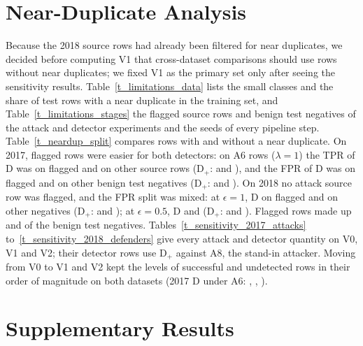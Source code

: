 \section{Near-Duplicate Analysis}
\label{sec:sens}
Because the 2018 source rows had already been filtered for near duplicates, we decided before computing V1 that
cross-dataset comparisons should use rows without near duplicates; we fixed V1 as the primary set only after seeing the
sensitivity results.
Table~\ref{t_limitations_data} lists the small classes and the share of test rows with a
near duplicate in the training set, and Table~\ref{t_limitations_stages} the flagged source rows and benign test
negatives of the attack and detector experiments and the seeds of every pipeline step.
Table~\ref{t_neardup_split} compares rows with and without a near duplicate.
On 2017, flagged rows were easier for both detectors: on A6 rows ($\lambda = 1$) the TPR of D was \tprDNdSeventeen{} on
flagged and \tprDOtherSeventeen{} on other source rows (D$_+$: \tprDplusNdSeventeen{} and \tprDplusOtherSeventeen), and
the FPR of D was \fprDNdSeventeen{} on flagged and \fprDOtherSeventeen{} on other benign test negatives (D$_+$:
\fprDplusNdSeventeen{} and \fprDplusOtherSeventeen).
On 2018 no attack source row was flagged, and the FPR split was mixed: at $\epsilon = 1$, D \fprDNdEighteen{} on flagged
and \fprDOtherEighteen{} on other negatives (D$_+$: \fprDplusNdEighteen{} and \fprDplusOtherEighteen); at
$\epsilon = 0.5$, D \fprDNdEighteenHalf{} and \fprDOtherEighteenHalf{} (D$_+$: \fprDplusNdEighteenHalf{} and
\fprDplusOtherEighteenHalf).
Flagged rows made up \ndNegSeventeen{} and \ndNegEighteen{} of the benign test negatives.
Tables~\ref{t_sensitivity_2017_attacks} to~\ref{t_sensitivity_2018_defenders} give every attack and detector quantity on
V0, V1 and V2; their detector rows use D$_+$ against A8, the stand-in attacker.
Moving from V0 to V1 and V2 kept the levels of successful and undetected rows in their order of magnitude on both
datasets (2017 D under A6: \undetDAsixOneVzeroSeventeen, \undetDAsixOneVoneSeventeen, \undetDAsixOneVtwoSeventeen).









\FloatBarrier
\section{Supplementary Results}
\label{sec:supp}

